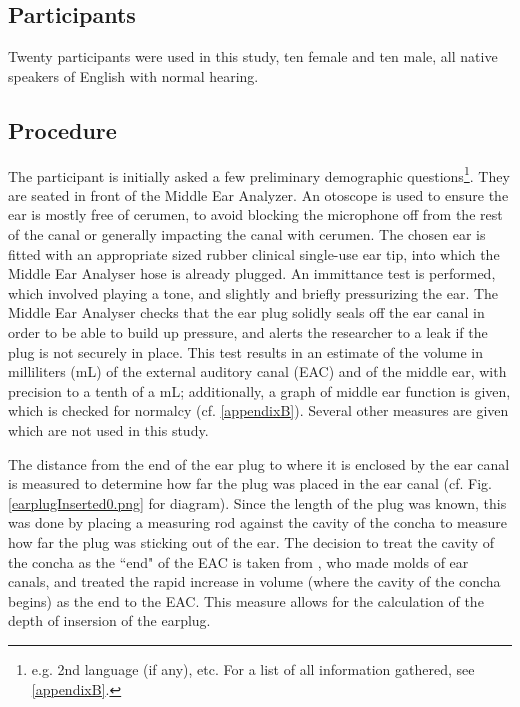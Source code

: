 \documentclass[dissertation,copyright]{uathesis}
\begin{document}
\subsection{Participants}
Twenty participants were used in this study, ten female and ten male, all native speakers of English with normal hearing.

\subsection{Procedure}

The participant is initially asked a few preliminary demographic questions\footnote{e.g. 2nd language (if any), etc. For a list of all information gathered, see \ref{appendixB}.}. They are seated in front of the Middle Ear Analyzer.  An otoscope is used to ensure the ear is mostly free of cerumen, to avoid blocking the microphone off from the rest of the canal or generally impacting the canal with cerumen.  The chosen ear is fitted with an appropriate sized rubber clinical single-use ear tip, into which the Middle Ear Analyser hose is already plugged.  An immittance test is performed, which involved playing a tone, and slightly and briefly pressurizing the ear.  The Middle Ear Analyser checks that the ear plug solidly seals off the ear canal in order to be able to build up pressure, and alerts the researcher to a leak if the plug is not securely in place.  This test results in an estimate of the volume in milliliters (mL) of the external auditory canal (EAC) and of the middle ear, with precision to a tenth of a mL; additionally, a graph of middle ear function is given, which is checked for normalcy (cf. \ref{appendixB}).  Several other measures are given which are not used in this study.

The distance from the end of the ear plug to where it is enclosed by the ear canal is measured to determine how far the plug was placed in the ear canal (cf. Fig. \ref{earplugInserted0.png} for diagram).  Since the length of the plug was known, this was done by placing a measuring rod against the cavity of the concha to measure how far the plug was sticking out of the ear. The decision to treat the cavity of the concha as the ``end" of the EAC is taken from \cite{stenfelt:07}, who made molds of ear canals, and treated the rapid increase in volume (where the cavity of the concha begins) as the end to the EAC.  This measure allows for the calculation of the depth of insersion of the earplug.
\end{document}
